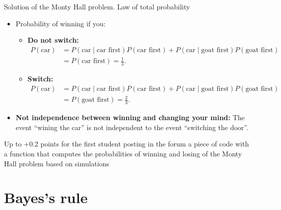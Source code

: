 \documentclass[aspectratio=169]{beamer}
\begin{document}
\begin{frame}{Solution of the Monty Hall problem. Law of total probability}
    
    \begin{itemize}
        \item Probability of winning if you:
        \begin{itemize}
            \item[$\bullet$] \textbf{Do not switch:}
            \begin{align*}
                P(\text{car}) &= P(\text{car} \mid \text{car first}) P(\text{car first}) + P(\text{car} \mid \text{goat first}) P(\text{goat first}) \\
                &= P(\text{car first}) = \frac{1}{3}.
            \end{align*}
            \item[$\bullet$] \textbf{Switch:}
            \begin{align*}
                P(\text{car}) &= P(\text{car} \mid \text{car first}) P(\text{car first}) + P(\text{car} \mid \text{goat first}) P(\text{goat first}) \\
                &= P(\text{goat first}) = \frac{2}{3}.
            \end{align*}
        \end{itemize}
    \end{itemize}
    
    \begin{itemize}
        \item \textbf{Not independence between winning and changing your mind:} The event ``wining the car'' is not independent to the event ``switching the door''.
    \end{itemize}
    \vspace{0.2cm}
    
    \scriptsize{Up to +0.2 points for the first student posting in the forum a piece of code with a function that computes the probabilities of winning and losing of the Monty Hall problem based on simulations}

\end{frame}

\section{\large Bayes's rule}
\end{document}
